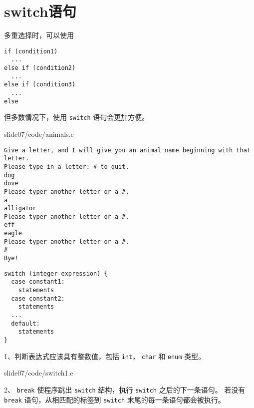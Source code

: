 \section{switch语句}
\begin{frame}[fragile]\ft{\secname}
多重选择时，可以使用
\begin{lstlisting}
if (condition1)
  ...
else if (condition2)
  ...
else if (condition3)
  ...
else    
\end{lstlisting}
但多数情况下，使用 \lstinline|switch| 语句会更加方便。
\end{frame}

\begin{frame}\ft{\secname}

{slide07/code/animals.c}
\end{frame}


\begin{frame}[fragile]\ft{\secname}
\begin{lstlisting}[backgroundcolor=\color{blue!20}]
Give a letter, and I will give you an animal name beginning with that letter.
Please type in a letter: # to quit.
dog
dove
Please typer another letter or a #.
a
alligator
Please typer another letter or a #.
eff
eagle
Please typer another letter or a #.
#
Bye!
\end{lstlisting}
\end{frame}

\begin{frame}[fragile]\ft{\secname}
\begin{lstlisting}[title=switch语法]
switch (integer expression) {
  case constant1:
    statements
  case constant2:
    statements
  ...
  default:
    statements
}    
\end{lstlisting}
\end{frame}

\begin{frame}[fragile]\ft{\secname}
  1、判断表达式应该具有整数值，包括 \lstinline|int|， \lstinline|char| 和 \lstinline|enum| 类型。
\end{frame}

\begin{frame}[fragile]\ft{\secname}
  
  {slide07/code/switch1.c}
\end{frame}

\begin{frame}[fragile]\ft{\secname}
2、 \lstinline|break| 使程序跳出 \lstinline|switch| 结构，执行 \lstinline|switch| 之后的下一条语句。 若没有 \lstinline|break| 语句，从相匹配的标签到 \lstinline|switch| 末尾的每一条语句都会被执行。
\end{frame}

